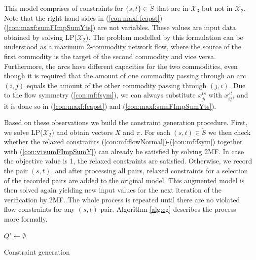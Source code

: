 This model comprises of constraints for $\{s,t\}\in\check{S}$ that are in $\mathcal{X}_3$ but not in $\mathcal{X}_2$.
Note that the right-hand sides in (\ref{con:maxf:fcapst})-(\ref{con:maxf:sumFImpSumYts}) are not variables.
These values are input data obtained by solving LP($\mathcal{X}_2$).
The problem modelled by this formulation can be understood as a maximum 2-commodity network flow, where the source of the first commodity is the target of the second commodity and vice versa.
Furthermore, the arcs have different capacities for the two commodities, even though it is required that the amount of one commodity passing through an arc $(i,j)$ equals the amount of the other commodity passing through $(j,i)$.
Due to the flow symmetry (\ref{con:mf:fsym}), we can always substitute $x^{ts}_{ji}$ with $x^{st}_{ij}$, and it is done so in (\ref{con:maxf:fcapst}) and (\ref{con:maxf:sumFImpSumYts}).
 
Based on these observations we build the constraint generation procedure.
First, we solve LP($\mathcal{X}_2$) and obtain vectors $X$ and $\pi$.
For each $(s,t)\in \check{S}$ we then check whether the relaxed constraints (\ref{con:mf:flowNormal})-(\ref{con:mf:fsym}) together with (\ref{con:vi:sumFImpSumY}) can already be satisfied by solving 2MF.
In case the objective value is 1, the relaxed constraints are satisfied.
Otherwise, we record the pair $(s,t)$, and after processing all pairs, relaxed constraints for a selection of the recorded pairs are added to the original model.
This augmented model is then solved again yielding new input values for the next iteration of the verification by 2MF.
The whole process is repeated until there are no violated flow constraints for any $(s,t)$ pair.
Algorithm \ref{alg:cg} describes the process more formally.

\begin{algorithm}
$Q'\leftarrow\emptyset$
 ~\newline
 \caption{Constraint generation}
\label{alg:cg}
\end{algorithm}

